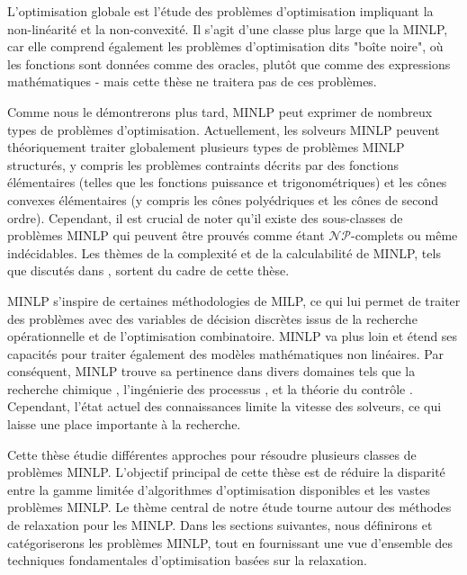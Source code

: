 L'optimisation globale est l'étude des problèmes d'optimisation impliquant la non-linéarité et la non-convexité. Il s'agit d'une classe plus large que la MINLP, car elle comprend également les problèmes d'optimisation dits "boîte noire", où les fonctions sont données comme des oracles, plutôt que comme des expressions mathématiques - mais cette thèse ne traitera pas de ces problèmes.


Comme nous le démontrerons plus tard, MINLP peut exprimer de nombreux types de problèmes d'optimisation.
Actuellement, les solveurs MINLP \cite{couenne,bestuzheva2023global,sahinidis:baron:21.1.13} peuvent théoriquement traiter globalement plusieurs types de problèmes MINLP structurés, y compris les problèmes contraints décrits par des fonctions élémentaires (telles que les fonctions puissance et trigonométriques) et les cônes convexes élémentaires (y compris les cônes polyédriques et les cônes de second ordre).  Cependant, il est crucial de noter qu'il existe des sous-classes de problèmes MINLP qui peuvent être prouvés comme étant $\mathcal{NP}$-complets ou même indécidables. Les thèmes de la complexité et de la calculabilité de MINLP, tels que discutés dans \cite{liberti2019undecidability}, sortent du cadre de cette thèse.

MINLP s'inspire de certaines méthodologies de MILP, ce qui lui permet de traiter des problèmes avec des variables de décision discrètes issus de la recherche opérationnelle et de l'optimisation combinatoire.  MINLP va plus loin et étend ses capacités pour traiter également des modèles mathématiques non linéaires. Par conséquent, MINLP trouve sa pertinence dans divers domaines tels que la recherche chimique \cite{pistikopoulos2021process}, l'ingénierie des processus \cite{kocis1989computational}, et la théorie du contrôle \cite{harjunkoski2009integration}.  Cependant, l'état actuel des connaissances limite la vitesse des solveurs, ce qui laisse une place importante à la recherche.

Cette thèse étudie différentes approches pour résoudre plusieurs classes de problèmes MINLP. L'objectif principal de cette thèse est de réduire la disparité entre la gamme limitée d'algorithmes d'optimisation disponibles et les vastes problèmes MINLP. Le thème central de notre étude tourne autour des méthodes de relaxation pour les MINLP. Dans les sections suivantes, nous définirons et catégoriserons les problèmes MINLP, tout en fournissant une vue d'ensemble des techniques fondamentales d'optimisation basées sur la relaxation.

